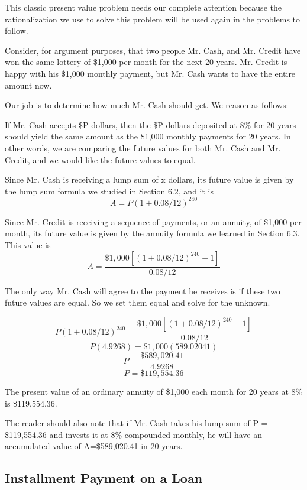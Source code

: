 \begin{solution}
    This classic present value problem needs our complete attention because the rationalization we use to solve this problem will be used again in the problems to follow.

    Consider, for argument purposes, that two people Mr. Cash, and Mr. Credit have won the same lottery of \$1,000 per month for the next 20 years. Mr. Credit is happy with his \$1,000 monthly payment, but Mr. Cash wants to have the entire amount now.

    Our job is to determine how much Mr. Cash should get. We reason as follows:

    If Mr. Cash accepts \$P dollars, then the \$P dollars deposited at 8\% for 20 years should yield the same amount as the \$1,000 monthly payments for 20 years. In other words, we are comparing the future values for both Mr. Cash and Mr. Credit, and we would like the future values to equal.

    Since Mr. Cash is receiving a lump sum of x dollars, its future value is given by the lump sum formula we studied in Section 6.2, and it is
    \[ A = P(1 + 0.08/12)^{240} \]

    Since Mr. Credit is receiving a sequence of payments, or an annuity, of \$1,000 per month, its future value is given by the annuity formula we learned in Section 6.3. This value is
    \[ A = \frac{\$1,000[(1 + 0.08/12)^{240} - 1]}{0.08/12} \]

    The only way Mr. Cash will agree to the payment he receives is if these two future values are equal. So we set them equal and solve for the unknown.

    \[ P(1 + 0.08/12)^{240} = \frac{\$1,000[(1 + 0.08/12)^{240} - 1]}{0.08/12} \]
    \[ P(4.9268) = \$1,000(589.02041) \]
    \[ P = \frac{\$589,020.41}{4.9268} \]
    \[ P = \$119,554.36 \]

    The present value of an ordinary annuity of \$1,000 each month for 20 years at 8\% is \$119,554.36.

    The reader should also note that if Mr. Cash takes his lump sum of P = \$119,554.36 and invests it at 8\% compounded monthly, he will have an accumulated value of A=\$589,020.41 in 20 years.
\end{solution}

\subsection{Installment Payment on a Loan}

